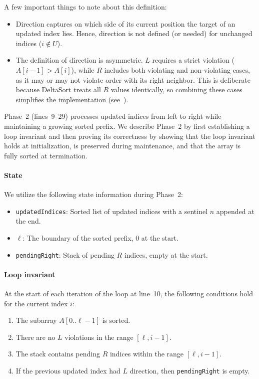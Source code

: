 A few important things to note about this definition:
\begin{itemize}
  \item Direction captures on which side of its current position the target of an updated index lies. Hence, direction is not defined (or needed) for unchanged indices ($i \notin U$).
  \item The definition of direction is asymmetric. $L$ requires a strict violation ($A[i-1] > A[i]$), while $R$ includes both violating and non-violating cases, as it may or may not violate order with its right neighbor. This is deliberate because DeltaSort treats all $R$ values identically, so combining these cases simplifies the implementation (see~).
\end{itemize}



Phase~2 (lines~9--29) processes updated indices from left to right while maintaining a growing sorted prefix. We describe Phase~2 by first establishing a loop invariant and then proving its correctness by showing that the loop invariant holds at initialization, is preserved during maintenance, and that the array is fully sorted at termination.

\paragraph{State} We utilize the following state information during Phase~2:
\begin{itemize}
  \item \texttt{updatedIndices}: Sorted list of updated indices with a sentinel $n$ appended at the end.
  \item $\ell$: The boundary of the sorted prefix, $0$ at the start.
  \item \texttt{pendingRight}: Stack of pending $R$ indices, empty at the start.
\end{itemize}

\paragraph{Loop invariant} At the start of each iteration of the loop at line~10, the following conditions hold for the current index $i$:
\begin{enumerate}
  \item The subarray $A[0..\ell-1]$ is sorted.
  \item There are no $L$ violations in the range $[\ell, i-1]$.
  \item The stack contains pending $R$ indices within the range $[\ell, i-1]$.
  \item If the previous updated index had $L$ direction, then \texttt{pendingRight} is empty.
\end{enumerate}

